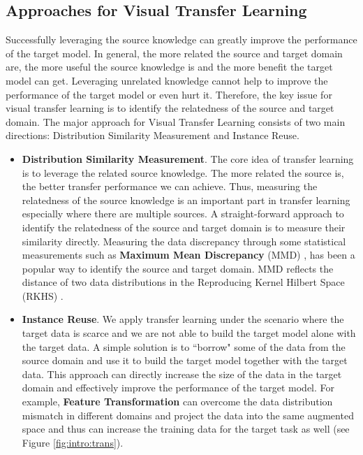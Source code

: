 \subsection{Approaches for Visual Transfer Learning}
Successfully leveraging the source knowledge can greatly improve the performance of the target model. In general, the more related the source and target domain are, the more useful the source knowledge is and the more benefit the target model can get. Leveraging unrelated knowledge cannot help to improve the performance of the target model or even hurt it. Therefore, the key issue for visual transfer learning is to identify the relatedness of the source and target domain. The major approach for Visual Transfer Learning consists of two main directions: Distribution Similarity Measurement and Instance Reuse.

\begin{itemize}
	\item \textbf{Distribution Similarity Measurement}. The core idea of transfer learning is to leverage the related source knowledge. The more related the source is, the better transfer performance we can achieve. Thus, measuring the relatedness of the source knowledge is an important part in transfer learning especially where there are multiple sources. A straight-forward approach to identify the relatedness of the source and target domain is to measure their similarity directly. Measuring the data discrepancy through some statistical measurements such as \textbf{Maximum Mean Discrepancy} (MMD) \cite{duan2009domain}, has been a popular way to identify the source and target domain. MMD reflects the distance of two data distributions in the Reproducing Kernel Hilbert Space (RKHS) \cite{aronszajn1950theory}.
	\item \textbf{Instance Reuse}\cite{lim2012transfer}. We apply transfer learning under the scenario where the target data is scarce and we are not able to build the target model alone with the target data. A simple solution is to ``borrow" some of the data from the source domain and use it to build the target model together with the target data. This approach can directly increase the size of the data in the target domain and effectively improve the performance of the target model. For example, \textbf{Feature Transformation} \cite{duan2012learning} can overcome the data distribution mismatch in different domains and project the data into the same augmented space and thus can increase the training data for the target task as well (see Figure \ref{fig:intro:trans}).
\end{itemize}

